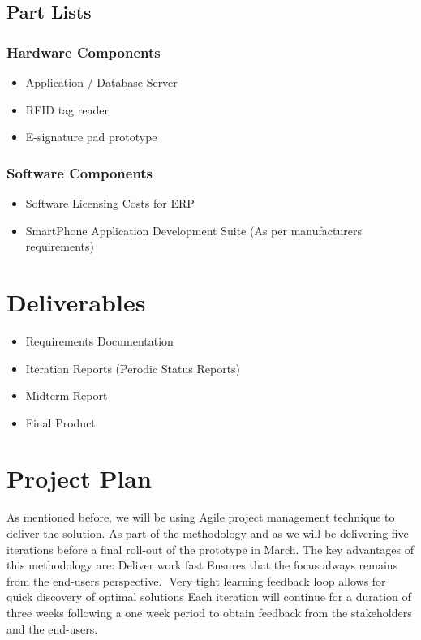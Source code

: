 \documentclass{journal}
\begin{document}
\subsection{Part Lists} 

\subsubsection{ Hardware Components }
\begin{itemize}
\item{Application / Database Server}
\item{RFID tag reader}
\item{E-signature pad prototype}
\end{itemize}

\subsubsection{ Software Components }
\begin{itemize}
\item{Software Licensing Costs for ERP }
\item{SmartPhone Application Development Suite (As per manufacturers requirements)}
\end{itemize}

\section{Deliverables}
\begin{itemize}
 \item{ Requirements Documentation }
 \item{ Iteration Reports (Perodic Status Reports) }
 \item{ Midterm Report}
 \item{ Final Product }
\end{itemize}
\section{Project Plan}
As mentioned before, we will be using Agile project management technique to deliver the solution. As part of the methodology and as we will be delivering five iterations before a final roll-out of the prototype in March. The key advantages of this methodology are:
Deliver work fast
Ensures that the focus always remains from the end-users perspective. 
Very tight learning feedback loop allows for quick discovery of optimal solutions
Each iteration will continue for a duration of three weeks following a one week period to obtain feedback from the stakeholders and the end-users.
\newpage
\end{document}
